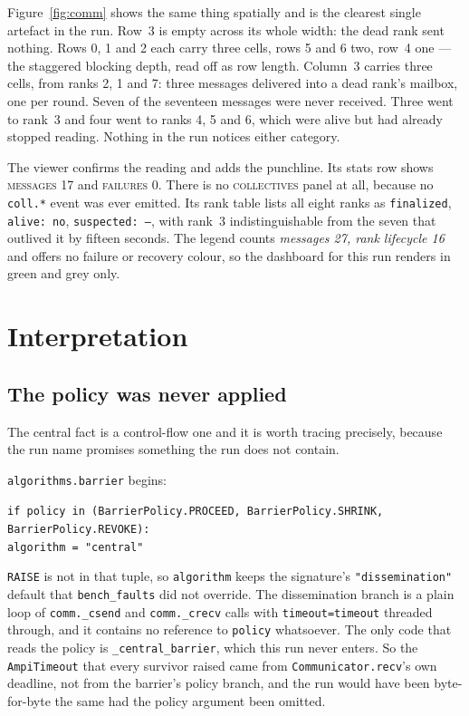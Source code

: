 \documentclass[11pt]{article}
\begin{document}
Figure~\ref{fig:comm} shows the same thing spatially and is the clearest single artefact
in the run. Row~3 is empty across its whole width: the dead rank sent nothing. Rows 0, 1
and 2 each carry three cells, rows 5 and 6 two, row~4 one --- the staggered blocking
depth, read off as row length. Column~3 carries three cells, from ranks 2, 1 and 7: three
messages delivered into a dead rank's mailbox, one per round. Seven of the seventeen
messages were never received. Three went to rank~3 and four went to ranks 4, 5 and 6,
which were alive but had already stopped reading. Nothing in the run notices either
category.

The viewer confirms the reading and adds the punchline. Its stats row shows
\textsc{messages 17} and \textsc{failures 0}. There is no \textsc{collectives} panel at
all, because no \texttt{coll.*} event was ever emitted. Its rank table lists all eight
ranks as \texttt{finalized}, \texttt{alive: no}, \texttt{suspected: --}, with rank~3
indistinguishable from the seven that outlived it by fifteen seconds. The legend counts
\emph{messages 27, rank lifecycle 16} and offers no failure or recovery colour, so the
dashboard for this run renders in green and grey only.

\section{Interpretation}

\subsection{The policy was never applied}

The central fact is a control-flow one and it is worth tracing precisely, because the run
name promises something the run does not contain.

\texttt{algorithms.barrier} begins:

\begin{center}
\texttt{if policy in (BarrierPolicy.PROCEED, BarrierPolicy.SHRINK, BarrierPolicy.REVOKE):}\\
\texttt{\hspace*{2em}algorithm = "central"}
\end{center}

\noindent\texttt{RAISE} is not in that tuple, so \texttt{algorithm} keeps the signature's
\texttt{"dissemination"} default that \texttt{bench\_faults} did not override. The
dissemination branch is a plain loop of \texttt{comm.\_csend} and \texttt{comm.\_crecv}
calls with \texttt{timeout=timeout} threaded through, and it contains no reference to
\texttt{policy} whatsoever. The only code that reads the policy is
\texttt{\_central\_barrier}, which this run never enters. So the
\texttt{AmpiTimeout} that every survivor raised came from
\texttt{Communicator.recv}'s own deadline, not from the barrier's policy branch, and the
run would have been byte-for-byte the same had the policy argument been omitted.
\end{document}
